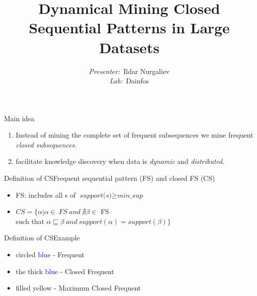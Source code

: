 \documentclass[12pt]{beamer}
\title{\fontsize{15}{15}\selectfont
	\textbf{Dynamical Mining Closed Sequential Patterns in Large Datasets
}}
\author{
	\fontvi
	\small{%
\emph{Presenter:}~Ildar Nurgaliev\\%
\emph{Lab:}~Dainfos}\\%
}
\date{}
\begin{document}
\maketitle

\begin{frame}{Main idea}
  \begin{enumerate}
  \item Instead of mining the complete set of frequent subsequences we mine frequent \textit{closed subsequences}.
  \item facilitate knowledge discovery when data is {\it dynamic} and {\it distributed}.
  \end{enumerate}
\end{frame}

\begin{frame}{Definition of CS}{Frequent sequential pattern (FS) and closed FS (CS)}
\begin{itemize}
\item FS: includes all s of $\textit{support(s)} \ge \textit{min\_sup}$
\item $CS = \{ \alpha|\alpha \in~FS~and~\nexists\beta \in$ FS\\such that $\alpha \sqsubseteq \beta~and~support(\alpha) = support(\beta)\}$
\end{itemize}
\end{frame}

\begin{frame}{Definition of CS}{Example}
\begin{figure}
\end{figure}
\begin{itemize}
  \item circled \textcolor{blue}{blue} - Frequent
  \item the thick \textcolor{blue}{blue} - Closed Frequent
  \item filled yellow - Maximum Closed Frequent
\end{itemize}
\end{frame}
\end{document}
